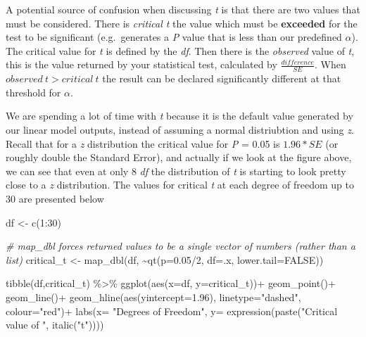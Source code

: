 \documentclass[
]{book}
\newenvironment{Shaded}{\begin{snugshade}}{\end{snugshade}}
\newcommand{\AttributeTok}[1]{\textcolor[rgb]{0.77,0.63,0.00}{#1}}
\newcommand{\CommentTok}[1]{\textcolor[rgb]{0.56,0.35,0.01}{\textit{#1}}}
\newcommand{\ConstantTok}[1]{\textcolor[rgb]{0.00,0.00,0.00}{#1}}
\newcommand{\DecValTok}[1]{\textcolor[rgb]{0.00,0.00,0.81}{#1}}
\newcommand{\FloatTok}[1]{\textcolor[rgb]{0.00,0.00,0.81}{#1}}
\newcommand{\FunctionTok}[1]{\textcolor[rgb]{0.00,0.00,0.00}{#1}}
\newcommand{\NormalTok}[1]{#1}
\newcommand{\OtherTok}[1]{\textcolor[rgb]{0.56,0.35,0.01}{#1}}
\newcommand{\SpecialCharTok}[1]{\textcolor[rgb]{0.00,0.00,0.00}{#1}}
\newcommand{\StringTok}[1]{\textcolor[rgb]{0.31,0.60,0.02}{#1}}
\begin{document}
A potential source of confusion when discussing \emph{t} is that there are two values that must be considered. There is \emph{critical t} the value which must be \textbf{exceeded} for the test to be significant (e.g.~generates a \emph{P} value that is less than our predefined \(\alpha\)). The critical value for \emph{t} is defined by the \emph{df}. Then there is the \emph{observed } value of \emph{t}, this is the value returned by your statistical test, calculated by \(\frac{difference}{SE}\). When \(observed~t > critical~t\) the result can be declared significantly different at that threshold for \(\alpha\).

We are spending a lot of time with \emph{t} because it is the default value generated by our linear model outputs, instead of assuming a normal distriubtion and using \emph{z}. Recall that for a \emph{z} distribution the critical value for \emph{P} = 0.05 is \(1.96 * SE\) (or roughly double the Standard Error), and actually if we look at the figure above, we can see that even at only 8 \emph{df} the distribution of \emph{t} is starting to look pretty close to a \emph{z} distribution. The values for critical \emph{t} at each degree of freedom up to 30 are presented below

\begin{Shaded}
\begin{Highlighting}[]
\NormalTok{df }\OtherTok{\textless{}{-}} \FunctionTok{c}\NormalTok{(}\DecValTok{1}\SpecialCharTok{:}\DecValTok{30}\NormalTok{)}

\CommentTok{\# map\_dbl forces returned values to be a single vector of numbers (rather than a list)}
\NormalTok{critical\_t }\OtherTok{\textless{}{-}} \FunctionTok{map\_dbl}\NormalTok{(df, }\SpecialCharTok{\textasciitilde{}}\FunctionTok{qt}\NormalTok{(}\AttributeTok{p=}\FloatTok{0.05}\SpecialCharTok{/}\DecValTok{2}\NormalTok{, }\AttributeTok{df=}\NormalTok{.x, }\AttributeTok{lower.tail=}\ConstantTok{FALSE}\NormalTok{))}

\FunctionTok{tibble}\NormalTok{(df,critical\_t) }\SpecialCharTok{\%\textgreater{}\%} 
  \FunctionTok{ggplot}\NormalTok{(}\FunctionTok{aes}\NormalTok{(}\AttributeTok{x=}\NormalTok{df, }\AttributeTok{y=}\NormalTok{critical\_t))}\SpecialCharTok{+}
  \FunctionTok{geom\_point}\NormalTok{()}\SpecialCharTok{+}
  \FunctionTok{geom\_line}\NormalTok{()}\SpecialCharTok{+}
  \FunctionTok{geom\_hline}\NormalTok{(}\FunctionTok{aes}\NormalTok{(}\AttributeTok{yintercept=}\FloatTok{1.96}\NormalTok{), }\AttributeTok{linetype=}\StringTok{"dashed"}\NormalTok{, }\AttributeTok{colour=}\StringTok{"red"}\NormalTok{)}\SpecialCharTok{+}
  \FunctionTok{labs}\NormalTok{(}\AttributeTok{x=} \StringTok{"Degrees of Freedom"}\NormalTok{,}
       \AttributeTok{y=} \FunctionTok{expression}\NormalTok{(}\FunctionTok{paste}\NormalTok{(}\StringTok{"Critical value of "}\NormalTok{, }\FunctionTok{italic}\NormalTok{(}\StringTok{"t"}\NormalTok{))))}
\end{Highlighting}
\end{Shaded}
\end{document}
